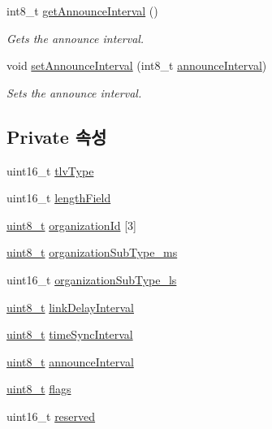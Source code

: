 \begin{DoxyCompactItemize}
int8\+\_\+t \hyperlink{class_signalling_t_l_v_a8e20ec016bac4695f5331383a8064b2b}{get\+Announce\+Interval} ()
\begin{DoxyCompactList}\small\item\em Gets the announce interval. \end{DoxyCompactList}\item 
void \hyperlink{class_signalling_t_l_v_a97886e1c0ee2bb1ca1d95fbf1f05f22b}{set\+Announce\+Interval} (int8\+\_\+t \hyperlink{class_signalling_t_l_v_a23008bec6b65a37290ae2699115b40ce}{announce\+Interval})
\begin{DoxyCompactList}\small\item\em Sets the announce interval. \end{DoxyCompactList}\end{DoxyCompactItemize}
\subsection*{Private 속성}
\begin{DoxyCompactItemize}
\item 
uint16\+\_\+t \hyperlink{class_signalling_t_l_v_a90baf0e86e13da82746e3aab1436388b}{tlv\+Type}
\item 
uint16\+\_\+t \hyperlink{class_signalling_t_l_v_a4dc83d7a14b4ddc8ba6051ab20ddcf1a}{length\+Field}
\item 
\hyperlink{stdint_8h_aba7bc1797add20fe3efdf37ced1182c5}{uint8\+\_\+t} \hyperlink{class_signalling_t_l_v_a30511459852792f2f0e687625d99530f}{organization\+Id} \mbox{[}3\mbox{]}
\item 
\hyperlink{stdint_8h_aba7bc1797add20fe3efdf37ced1182c5}{uint8\+\_\+t} \hyperlink{class_signalling_t_l_v_aaad8acec162fb623707af758bc49f425}{organization\+Sub\+Type\+\_\+ms}
\item 
uint16\+\_\+t \hyperlink{class_signalling_t_l_v_af5d5d56c0c74e3df1cae99986fafa44b}{organization\+Sub\+Type\+\_\+ls}
\item 
\hyperlink{stdint_8h_aba7bc1797add20fe3efdf37ced1182c5}{uint8\+\_\+t} \hyperlink{class_signalling_t_l_v_a9d82201fec4bc54ba5a9b690c2a927f4}{link\+Delay\+Interval}
\item 
\hyperlink{stdint_8h_aba7bc1797add20fe3efdf37ced1182c5}{uint8\+\_\+t} \hyperlink{class_signalling_t_l_v_a322abfc3cef9e3c3f4db4ef568a5e839}{time\+Sync\+Interval}
\item 
\hyperlink{stdint_8h_aba7bc1797add20fe3efdf37ced1182c5}{uint8\+\_\+t} \hyperlink{class_signalling_t_l_v_a23008bec6b65a37290ae2699115b40ce}{announce\+Interval}
\item 
\hyperlink{stdint_8h_aba7bc1797add20fe3efdf37ced1182c5}{uint8\+\_\+t} \hyperlink{class_signalling_t_l_v_aa2585d779da0ab21273a8d92de9a0ebe}{flags}
\item 
uint16\+\_\+t \hyperlink{class_signalling_t_l_v_a5a6ed8c04a3db86066924b1a1bf4dad3}{reserved}
\end{DoxyCompactItemize}



